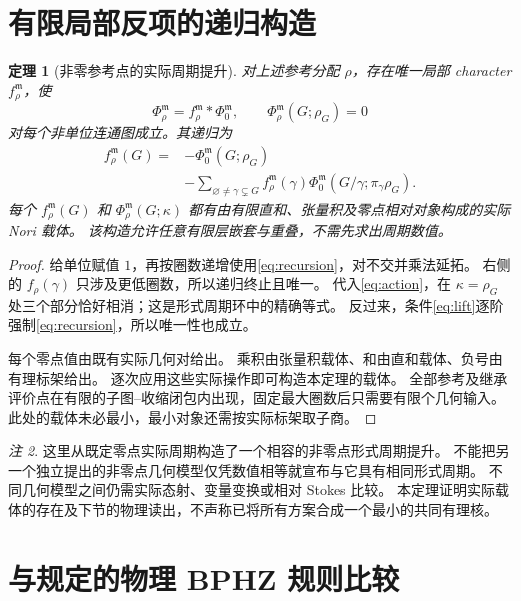 \documentclass[11pt,a4paper]{ctexart}
\theoremstyle{cnplain}
\newtheorem{theorem}{定理}[section]
\theoremstyle{remark}\newtheorem{remark}[theorem]{注}
\begin{document}
\section{有限局部反项的递归构造}
\begin{theorem}[非零参考点的实际周期提升]\label{thm:construction}
对上述参考分配 $\rho$，存在唯一局部 character $f_\rho^{\mathfrak m}$，使
\begin{equation}\label{eq:lift}
 \Phi_\rho^{\mathfrak m}=f_\rho^{\mathfrak m}*\Phi_0^{\mathfrak m},
 \qquad \Phi_\rho^{\mathfrak m}(G;\rho_G)=0
\end{equation}
对每个非单位连通图成立。其递归为
\begin{align}\label{eq:recursion}
 f_\rho^{\mathfrak m}(G)={}&-\Phi_0^{\mathfrak m}(G;\rho_G)\nonumber\\
 &-\sum_{\varnothing\ne\gamma\subsetneq G}
 f_\rho^{\mathfrak m}(\gamma)
 \Phi_0^{\mathfrak m}(G/\gamma;\pi_\gamma\rho_G).
\end{align}
每个 $f_\rho^{\mathfrak m}(G)$ 和 $\Phi_\rho^{\mathfrak m}(G;\kappa)$ 都有由有限直和、张量积及零点相对对象构成的实际 Nori 载体。
该构造允许任意有限层嵌套与重叠，不需先求出周期数值。
\end{theorem}
\begin{proof}
给单位赋值 $1$，再按圈数递增使用\eqref{eq:recursion}，对不交并乘法延拓。
右侧的 $f_\rho(\gamma)$ 只涉及更低圈数，所以递归终止且唯一。
代入\eqref{eq:action}，在 $\kappa=\rho_G$ 处三个部分恰好相消；这是形式周期环中的精确等式。
反过来，条件\eqref{eq:lift}逐阶强制\eqref{eq:recursion}，所以唯一性也成立。

每个零点值由既有实际几何对给出。
乘积由张量积载体、和由直和载体、负号由有理标架给出。
逐次应用这些实际操作即可构造本定理的载体。
全部参考及继承评价点在有限的子图--收缩闭包内出现，固定最大圈数后只需要有限个几何输入。
此处的载体未必最小，最小对象还需按实际标架取子商。
\end{proof}

\begin{remark}
这里从既定零点实际周期构造了一个相容的非零点形式周期提升。
不能把另一个独立提出的非零点几何模型仅凭数值相等就宣布与它具有相同形式周期。
不同几何模型之间仍需实际态射、变量变换或相对 Stokes 比较。
本定理证明实际载体的存在及下节的物理读出，不声称已将所有方案合成一个最小的共同有理核。
\end{remark}

\section{与规定的物理 BPHZ 规则比较}
\end{document}
